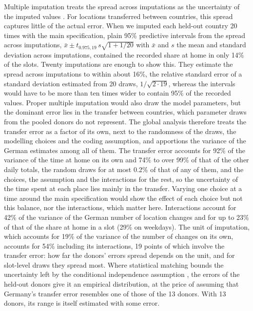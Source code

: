 \documentclass[a4paper]{article}
\begin{document}
Multiple imputation treats the spread across imputations as the uncertainty of the imputed values \parencite{rubinMultipleImputationNonresponse1987,vanbuurenFlexibleImputationMissing2012}. For locations transferred between countries, this spread captures little of the actual error. When we imputed each held-out country 20 times with the main specification, plain 95\% predictive intervals from the spread across imputations, $\bar{x} \pm t_{0.975,19}\, s \sqrt{1 + 1/20}$ with $\bar{x}$ and $s$ the mean and standard deviation across imputations, contained the recorded share at home in only 14\% of the slots. Twenty imputations are enough to show this. They estimate the spread across imputations to within about 16\%, the relative standard error of a standard deviation estimated from 20 draws, $1/\sqrt{2 \cdot 19}$, whereas the intervals would have to be more than ten times wider to contain 95\% of the recorded values. Proper multiple imputation would also draw the model parameters, but the dominant error lies in the transfer between countries, which parameter draws from the pooled donors do not represent. The global analysis therefore treats the transfer error as a factor of its own, next to the randomness of the draws, the modelling choices and the coding assumption, and apportions the variance of the German estimates among all of them. The transfer error accounts for 92\% of the variance of the time at home on its own and 74\% to over 99\% of that of the other daily totals, the random draws for at most 0.2\% of that of any of them, and the choices, the assumption and the interactions for the rest, so the uncertainty of the time spent at each place lies mainly in the transfer. Varying one choice at a time around the main specification would show the effect of each choice but not this balance, nor the interactions, which matter here. Interactions account for 42\% of the variance of the German number of location changes and for up to 23\% of that of the share at home in a slot (29\% on weekdays). The unit of imputation, which accounts for 19\% of the variance of the number of changes on its own, accounts for 54\% including its interactions, 19 points of which involve the transfer error: how far the donors' errors spread depends on the unit, and for slot-level draws they spread most. Where statistical matching bounds the uncertainty left by the conditional independence assumption \parencite{contiUncertaintyAnalysisStatistical2012}, the errors of the held-out donors give it an empirical distribution, at the price of assuming that Germany's transfer error resembles one of those of the 13 donors. With 13 donors, its range is itself estimated with some error.
\end{document}
